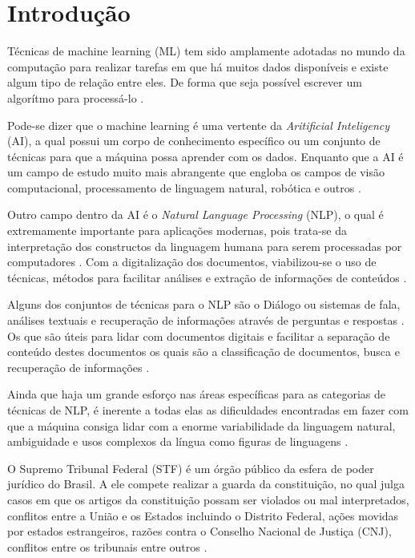 \chapter[Introdução]{Introdução}

Técnicas de machine learning (ML) tem sido amplamente adotadas no mundo da computação para realizar tarefas em que há muitos dados disponíveis e existe algum tipo de relação entre eles. De forma que seja possível escrever um algorítmo para processá-lo \cite{BRINK2015}.

Pode-se dizer que o machine learning é uma vertente da \textit{Aritificial Inteligency} (AI), a qual possui um corpo de conhecimento específico ou um conjunto de técnicas para que a máquina possa aprender com os dados. Enquanto que a AI é um campo de estudo muito mais abrangente que engloba os campos de visão computacional, processamento de linguagem natural, robótica e outros \cite{BRINK2015}. 

Outro campo dentro da AI é o \textit{Natural Language Processing} (NLP), o qual é extremamente importante para aplicações modernas, pois trata-se da interpretação dos constructos da linguagem humana para serem processadas por computadores \cite{GOLDBERG2017}.
Com a digitalização dos documentos, viabilizou-se o uso de técnicas, métodos para facilitar análises e extração de informações de conteúdos \cite{OLIVEIRA2017}.

Alguns dos conjuntos de técnicas para o NLP são o Diálogo ou sistemas de fala, análises textuais e recuperação de informações através de perguntas e respostas \cite{ESLICKandLIU2005}. Os que são úteis para lidar com documentos digitais e facilitar a separação de conteúdo destes documentos os quais são a classificação de documentos, busca e recuperação de informações \cite{OLIVEIRA2017}.

Ainda que haja um grande esforço nas áreas específicas para as categorias de técnicas de NLP, é inerente a todas elas as dificuldades encontradas em fazer com que a máquina consiga lidar com a enorme variabilidade da linguagem natural, ambiguidade e usos complexos da língua como figuras de linguagens \cite{GOLDBERG2017}. 

O Supremo Tribunal Federal (STF) é um órgão público da esfera de poder jurídico do Brasil. A ele compete realizar a guarda da constituição, no qual julga casos em que os artigos da constituição possam ser violados ou mal interpretados, conflitos entre a União e os Estados incluindo o Distrito Federal, ações movidas por estados estrangeiros, razões contra o Conselho Nacional de Justiça (CNJ), conflitos entre os tribunais entre outros \cite{BRASIL1988}.

